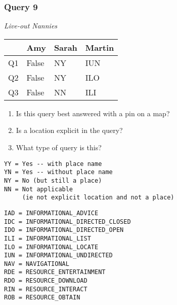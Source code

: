 \begin{frame}[fragile]
\frametitle{Query 9}
\vspace{1em}

\emph{Live-out Nannies}

\vfill

\begin{table}
  \centering
  \begin{tabular}{ l l l l }
    & \textbf{Amy} & \textbf{Sarah} & \textbf{Martin}\\
    \toprule
    Q1 & False & NY & IUN\\
Q2 & False & NY & ILO\\
Q3 & False & NN & ILI\\
    \bottomrule
  \end{tabular}
\end{table}

\vfill

\tiny{

\begin{enumerate}
\item Is this query best answered with a pin on a map?
\item Is a location explicit in the query?
\item What type of query is this?
\end{enumerate}

\vfill

\begin{multicols}{2}
\begin{verbatim}
YY = Yes -- with place name
YN = Yes -- without place name
NY = No (but still a place)
NN = Not applicable 
     (ie not explicit location and not a place)
\end{verbatim}

\columnbreak
\begin{verbatim}
IAD = INFORMATIONAL_ADVICE
IDC = INFORMATIONAL_DIRECTED_CLOSED
IDO = INFORMATIONAL_DIRECTED_OPEN
ILI = INFORMATIONAL_LIST
ILO = INFORMATIONAL_LOCATE
IUN = INFORMATIONAL_UNDIRECTED
NAV = NAVIGATIONAL
RDE = RESOURCE_ENTERTAINMENT
RDO = RESOURCE_DOWNLOAD
RIN = RESOURCE_INTERACT
ROB = RESOURCE_OBTAIN
\end{verbatim}
\end{multicols}
}

\end{frame}


